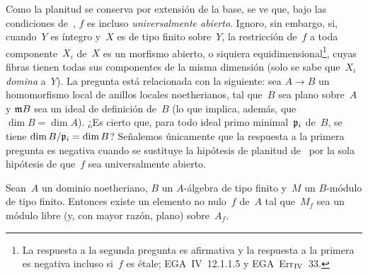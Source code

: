 \begin{remarquesstar}
Como la planitud se conserva por extensión de la base, se ve que, bajo las
condiciones de~, $f$
es incluso \emph{universalmente abierto}.
Ignoro, sin embargo, si, cuando~$Y$ es íntegro y~$X$ es de tipo finito
sobre~$Y$, la restricción de~$f$ a toda componente~$X_i$ de~$X$ es un
morfismo abierto, o siquiera equidimensional\footnote{La respuesta a la segunda pregunta es
afirmativa y la respuesta a la primera es negativa incluso si~$f$ es étale;
\cf EGA~IV~12.1.1.5 y EGA~Err$_{\rm IV}$~33.}, \ie cuyas fibras tienen
todas sus componentes de la misma dimensión (solo se sabe que~$X_i$
\emph{domina} a~$Y$).
La pregunta está relacionada con la siguiente: sea $A\to B$ un homomorfismo
local de anillos locales noetherianos, tal que~$B$ sea plano sobre~$A$ y
$\mathfrak{m}B$ sea un ideal de definición de~$B$ (lo que implica, además, que
$\dim B=\dim A$). ¿Es cierto que, para todo ideal primo minimal~$\mathfrak{p}_i$
de~$B$, se tiene $\dim B/\mathfrak{p}_i=\dim B$? Señalemos únicamente que la
respuesta a la primera pregunta es negativa cuando se sustituye la hipótesis
de planitud de~ por
la sola hipótesis de que~$f$ sea universalmente abierto.
\end{remarquesstar}

\begin{lemme}
\label{IV.6.7}
Sean~$A$ un dominio noetheriano, $B$ un $A$-álgebra de tipo finito y~$M$ un
$B$-módulo de tipo finito. Entonces existe un elemento no nulo~$f$ de~$A$
tal que~$M_f$ sea un módulo libre (y, con mayor razón, plano) sobre~$A_f$.
\end{lemme}

